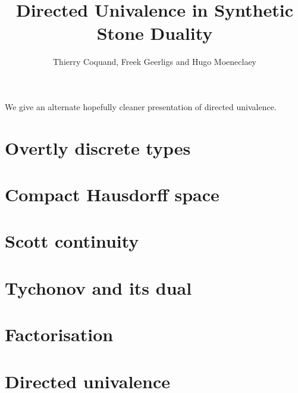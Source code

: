 \documentclass{../util/zariski}
\title{Directed Univalence in Synthetic Stone Duality}
\begin{document}
\author{Thierry Coquand, Freek Geerligs and Hugo Moeneclaey}

\maketitle

We give an alternate hopefully cleaner presentation of directed univalence.

\tableofcontents

\section{Overtly discrete types}


\section{Compact Hausdorff space}


\section{Scott continuity}


\section{Tychonov and its dual}


\section{Factorisation}


\section{Directed univalence}


\printbibliography
\end{document}
